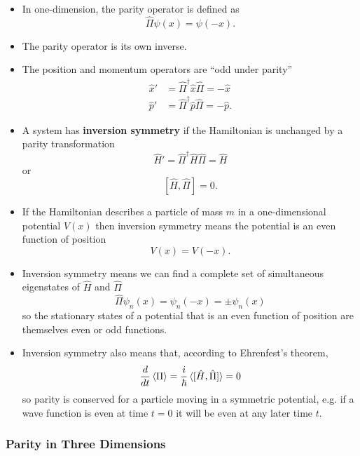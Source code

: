 \documentclass{article}
\begin{document}
\begin{itemize}
  \item In one-dimension, the parity operator is defined as \[\hat{\Pi} \psi(x) = \psi(-x).\]

  \item The parity operator is its own inverse.

  \item The position and momentum operators are ``odd under parity'' \begin{align*}
          \hat{x}' & = \hat{\Pi}^\dagger \hat{x} \hat{\Pi} = -\hat{x}  \\
          \hat{p}' & = \hat{\Pi}^\dagger \hat{p} \hat{\Pi} = -\hat{p}.
        \end{align*}

  \item A system has \textbf{inversion symmetry} if the Hamiltonian is unchanged by a parity transformation \[\hat{H}' = \hat{\Pi}^\dagger \hat{H} \hat{\Pi} = \hat{H}\] or \[[\hat{H}, \hat{\Pi}] = 0.\]

  \item If the Hamiltonian describes a particle of mass $m$ in a one-dimensional potential $V(x)$ then inversion symmetry means the potential is an even function of position \[V(x) = V(-x).\]

  \item Inversion symmetry means we can find a complete set of simultaneous eigenstates of $\hat{H}$ and $\hat{\Pi}$ \[\hat{\Pi} \psi_n(x) = \psi_n(-x) = \pm \psi_n(x)\] so the stationary states of a potential that is an even function of position are themselves even or odd functions.

  \item Inversion symmetry also means that, according to Ehrenfest's theorem, \[\frac{d}{d t} \braket{\Pi} = \frac{i}{\hbar} \braket{[\hat{H}, \hat{\Pi}]} = 0\] so parity is conserved for a particle moving in a symmetric potential, e.g. if a wave function is even at time $t = 0$ it will be even at any later time $t$.
\end{itemize}

\subsubsection{Parity in Three Dimensions}
\end{document}
